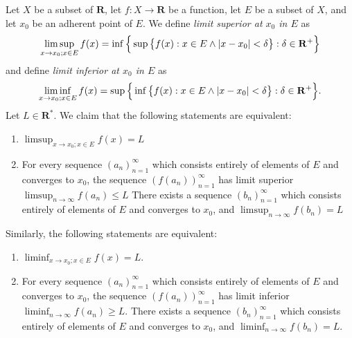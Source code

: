 \begin{additional corollary}\label{ac 9.3.1}
Let \(X\) be a subset of \(\mathbf{R}\), let \(f : X \to \mathbf{R}\) be a function, let \(E\) be a subset of \(X\), and let \(x_0\) be an adherent point of \(E\).
We define \emph{limit superior at \(x_0\) in \(E\)} as
\[
    \limsup_{x \to x_0 ; x \in E} f(x) = \inf\Big\{\sup\big\{f(x) : x \in E \land \abs*{x - x_0} < \delta\big\} : \delta \in \mathbf{R}^+\Big\}
\]
and define \emph{limit inferior at \(x_0\) in \(E\)} as
\[
    \liminf_{x \to x_0 ; x \in E} f(x) = \sup\Big\{\inf\big\{f(x) : x \in E \land \abs*{x - x_0} < \delta\big\} : \delta \in \mathbf{R}^+\Big\}.
\]
Let \(L \in \mathbf{R}^*\).
We claim that the following statements are equivalent:
\begin{enumerate}
    \item \(\limsup_{x \to x_0 ; x \in E} f(x) = L\)
    \item For every sequence \((a_n)_{n = 1}^\infty\) which consists entirely of elements of \(E\) and converges to \(x_0\), the sequence \((f(a_n))_{n = 1}^\infty\) has limit superior \(\limsup_{n \to \infty} f(a_n) \leq L\)
          There exists a sequence \((b_n)_{n = 1}^\infty\) which consists entirely of elements of \(E\) and converges to \(x_0\), and \(\limsup_{n \to \infty} f(b_n) = L\)
\end{enumerate}
Similarly, the following statements are equivalent:
\begin{enumerate}
    \item \(\liminf_{x \to x_0 ; x \in E} f(x) = L\).
    \item For every sequence \((a_n)_{n = 1}^\infty\) which consists entirely of elements of \(E\) and converges to \(x_0\), the sequence \((f(a_n))_{n = 1}^\infty\) has limit inferior \(\liminf_{n \to \infty} f(a_n) \geq L\).
          There exists a sequence \((b_n)_{n = 1}^\infty\) which consists entirely of elements of \(E\) and converges to \(x_0\), and \(\liminf_{n \to \infty} f(b_n) = L\).
\end{enumerate}
\end{additional corollary}

